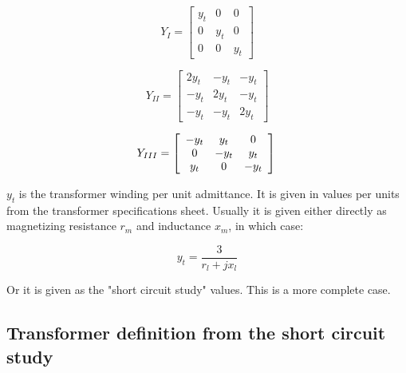 \documentclass[nols,a4paper,twoside,notoc,fleqn]{tufte-book}
\begin{document}
\begin{equation}
Y_{I} = \left[ \begin{array}{ccc}
y_t & 0 &  0 \\
0 & y_t & 0 \\ 
0 & 0 & y_t
\end{array} \right] 
\end{equation}

\begin{equation}
Y_{II} = \left[ \begin{array}{ccc}
2y_t & -y_t &  -y_t \\
-y_t & 2y_t & -y_t \\  
-y_t & -y_t & 2y_t
\end{array} \right] 
\end{equation}

\begin{equation}
Y_{III} = \left[ \begin{array}{ccc}
-y_t & y_t &  0 \\
0 & -y_t & y_t \\ 
y_t & 0 & -y_t
\end{array} \right] \newline
\end{equation}


$y_t$ is the transformer winding per unit admittance. It is given in values per units from the transformer specifications sheet. Usually it is given either directly as magnetizing resistance $r_m$ and inductance $x_m$, in which case:

\begin{equation}
y_t = \frac{3}{r_l + jx_l}
\end{equation}

Or it is given as the "short circuit study" values. This is a more complete case.



\subsection{Transformer definition from the short circuit study}
\end{document}
